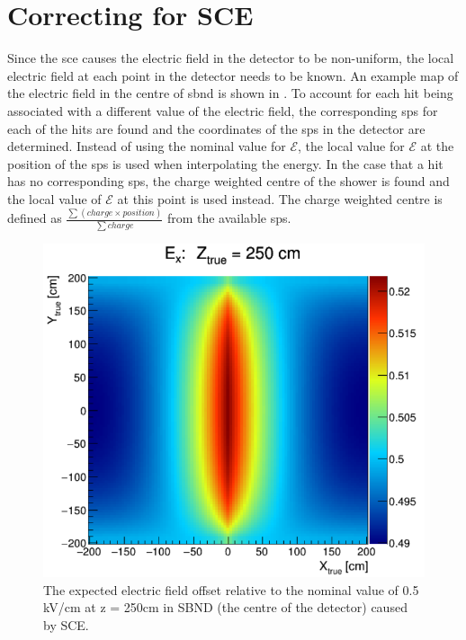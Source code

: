 \section{Correcting for SCE}
Since the \gls{sce} causes the electric field in the detector to be non-uniform, the local electric field at each point in the detector needs to be known. An example map of the electric field in the centre of \gls{sbnd} is shown in . To account for each hit being associated with a different value of the electric field, the corresponding \Glspl{sp} for each of the hits are found and the coordinates of the \glspl{sp} in the detector are determined. Instead of using the nominal value for $\mathcal{E}$, the local value for $\mathcal{E}$ at the position of the \Glspl{sp} is used when interpolating the energy. In the case that a hit has no corresponding \Glspl{sp}, the charge weighted centre of the shower is found and the local value of $\mathcal{E}$ at this point is used instead. The charge weighted centre is defined as $\frac{\sum (charge \times position)}{\sum charge}$ from the available \glspl{sp}.

\begin{figure}[h]
    \centering
    \includegraphics[width = \largefigwidth]{Figures/SCE_map_SBND.png}
    \caption{The expected electric field offset relative to the nominal value of 0.5 kV/cm at z = 250cm in SBND (the centre of the detector) caused by SCE.}
    \label{fig:SCE map}
\end{figure}


















